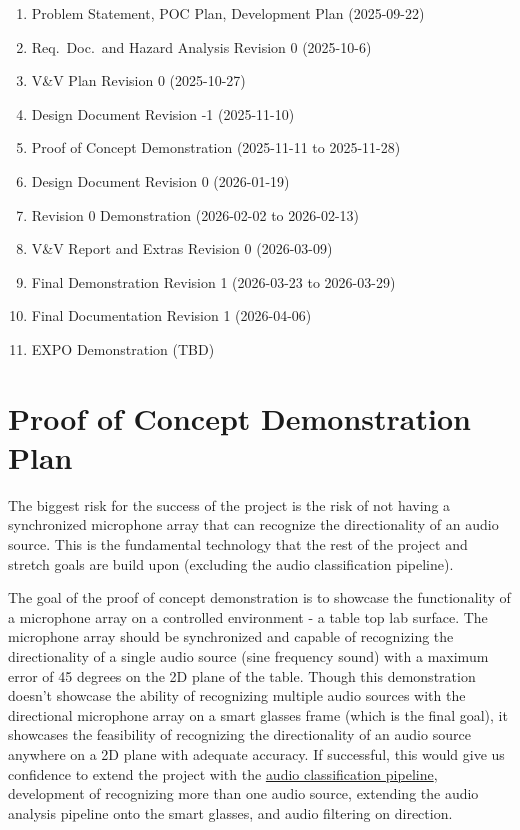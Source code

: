 \documentclass{article}
\begin{document}
\begin{enumerate}
  \item Problem Statement, POC Plan, Development Plan (2025-09-22)
  \item Req.\ Doc.\ and Hazard Analysis Revision 0 (2025-10-6)
  \item V\&V Plan Revision 0 (2025-10-27)
  \item Design Document Revision -1 (2025-11-10)
  \item Proof of Concept Demonstration (2025-11-11 to 2025-11-28)
  \item Design Document Revision 0 (2026-01-19)
  \item Revision 0 Demonstration (2026-02-02 to 2026-02-13)
  \item V\&V Report and Extras Revision 0 (2026-03-09)
  \item Final Demonstration Revision 1 (2026-03-23 to 2026-03-29)
  \item Final Documentation Revision 1 (2026-04-06)
  \item EXPO Demonstration (TBD)
\end{enumerate}

\section{Proof of Concept Demonstration Plan}

The biggest risk for the success of the project is the risk of not having a
synchronized microphone array that can recognize the directionality of an audio
source. This is the fundamental technology that the rest of the project and
stretch goals are build upon (excluding the audio classification pipeline).

The goal of the proof of concept demonstration is to showcase the functionality
of a microphone array on a controlled environment - a table top lab surface. The
microphone array should be synchronized and capable of recognizing the
directionality of a single audio source (sine frequency sound) with a maximum
error of 45 degrees on the 2D plane of the table. Though this demonstration
doesn't showcase the ability of recognizing multiple audio sources with the
directional microphone array on a smart glasses frame (which is the final goal),
it showcases the feasibility of recognizing the directionality of an audio
source anywhere on a 2D plane with adequate accuracy. If successful, this would
give us confidence to extend the project with the
\hyperlink{audio_classification_pipeline}{audio classification pipeline},
development of recognizing more than one audio source, extending the audio
analysis pipeline onto the smart glasses, and audio filtering on direction. 
\end{document}
